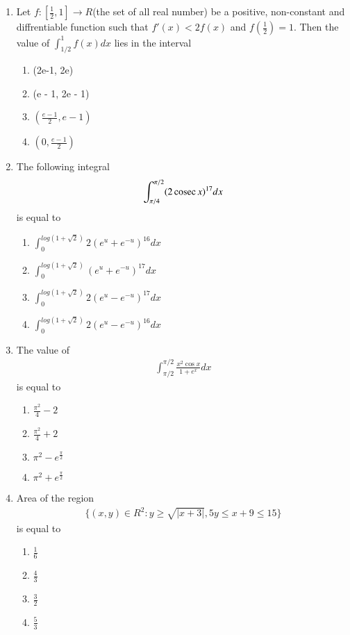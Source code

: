 \begin{enumerate}[label=\arabic*.,ref=\thesubsection.\theenumi]
\item Let $f: [\frac{1}{2}, 1] \to R$(the set of all real number) be a positive, non-constant and diffrentiable function such that $f'(x) < 2f(x)$ and $f(\frac{1}{2}) = 1$. Then the value of $\int_{1/2}^{1}f(x)dx$ lies in the interval
\begin{enumerate}
\item (2e-1, 2e)
\item (e - 1, 2e - 1)
\item $(\frac{e - 1}{2}, e - 1)$
\item $(0, \frac{e - 1}{2})$
\end{enumerate}

\item The following integral
\begin{align*}
\int_{\pi/4}^{\pi/2}(2\,\text{cosec}\, x)^{17}dx
\end{align*}
is equal to
\begin{enumerate}
\item $\int_{0}^{log(1 + \sqrt{2})}2(e^u + e^{-u})^{16}dx$
\item $\int_{0}^{log(1 + \sqrt{2})}(e^u + e^{-u})^{17}dx$
\item $\int_{0}^{log(1 + \sqrt{2})}2(e^u - e^{-u})^{17}dx$
\item $\int_{0}^{log(1 + \sqrt{2})}2(e^u - e^{-u})^{16}dx$
\end{enumerate}

\item The value of 
\begin{align*}
\int_{\pi/2}^{\pi/2}\frac{x^2 \cos x}{1 + e^x}dx
\end{align*}
is equal to
\begin{enumerate}
\item $\frac{\pi^2}{4} - 2$
\item $\frac{\pi^2}{4} + 2$
\item $\pi^2 - e^{\frac{\pi}{2}}$
\item $\pi^2 + e^{\frac{\pi}{2}}$
\end{enumerate}

\item Area of the region
\begin{align*}
\{(x, y) \in R^2: y \geq \sqrt{|x + 3|}, 5y \leq x + 9 \leq 15\}
\end{align*}
is equal to
\begin{enumerate}
\item $\frac{1}{6}$
\item $\frac{4}{3}$
\item $\frac{3}{2}$
\item $\frac{5}{3}$
\end{enumerate}


\end{enumerate}
